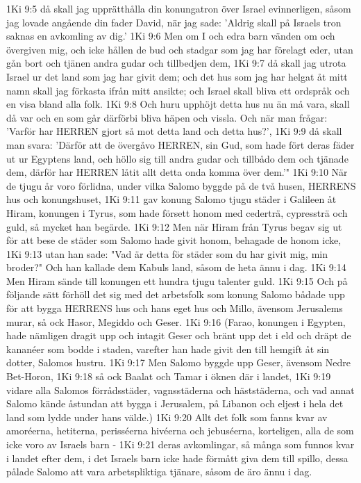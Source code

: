 1Ki 9:5  då skall jag upprätthålla din konungatron över Israel evinnerligen, såsom jag lovade angående din fader David, när jag sade: 'Aldrig skall på Israels tron saknas en avkomling av dig.'
1Ki 9:6  Men om I och edra barn vänden om och övergiven mig, och icke hållen de bud och stadgar som jag har förelagt eder, utan gån bort och tjänen andra gudar och tillbedjen dem,
1Ki 9:7  då skall jag utrota Israel ur det land som jag har givit dem; och det hus som jag har helgat åt mitt namn skall jag förkasta ifrån mitt ansikte; och Israel skall bliva ett ordspråk och en visa bland alla folk.
1Ki 9:8  Och huru upphöjt detta hus nu än må vara, skall då var och en som går därförbi bliva häpen och vissla. Och när man frågar: 'Varför har HERREN gjort så mot detta land och detta hus?',
1Ki 9:9  då skall man svara: 'Därför att de övergåvo HERREN, sin Gud, som hade fört deras fäder ut ur Egyptens land, och höllo sig till andra gudar och tillbådo dem och tjänade dem, därför har HERREN låtit allt detta onda komma över dem.'"
1Ki 9:10  När de tjugu år voro förlidna, under vilka Salomo byggde på de två husen, HERRENS hus och konungshuset,
1Ki 9:11  gav konung Salomo tjugu städer i Galileen åt Hiram, konungen i Tyrus, som hade försett honom med cederträ, cypressträ och guld, så mycket han begärde.
1Ki 9:12  Men när Hiram från Tyrus begav sig ut för att bese de städer som Salomo hade givit honom, behagade de honom icke,
1Ki 9:13  utan han sade: "Vad är detta för städer som du har givit mig, min broder?" Och han kallade dem Kabuls land, såsom de heta ännu i dag.
1Ki 9:14  Men Hiram sände till konungen ett hundra tjugu talenter guld.
1Ki 9:15  Och på följande sätt förhöll det sig med det arbetsfolk som konung Salomo bådade upp för att bygga HERRENS hus och hans eget hus och Millo, ävensom Jerusalems murar, så ock Hasor, Megiddo och Geser.
1Ki 9:16  (Farao, konungen i Egypten, hade nämligen dragit upp och intagit Geser och bränt upp det i eld och dräpt de kananéer som bodde i staden, varefter han hade givit den till hemgift åt sin dotter, Salomos hustru.
1Ki 9:17  Men Salomo byggde upp Geser, ävensom Nedre Bet-Horon,
1Ki 9:18  så ock Baalat och Tamar i öknen där i landet,
1Ki 9:19  vidare alla Salomos förrådsstäder, vagnsstäderna och häststäderna, och vad annat Salomo kände åstundan att bygga i Jerusalem, på Libanon och eljest i hela det land som lydde under hans välde.)
1Ki 9:20  Allt det folk som fanns kvar av amoréerna, hetiterna, perisséerna hivéerna och jebuséerna, korteligen, alla de som icke voro av Israels barn -
1Ki 9:21  deras avkomlingar, så många som funnos kvar i landet efter dem, i det Israels barn icke hade förmått giva dem till spillo, dessa pålade Salomo att vara arbetspliktiga tjänare, såsom de äro ännu i dag.

